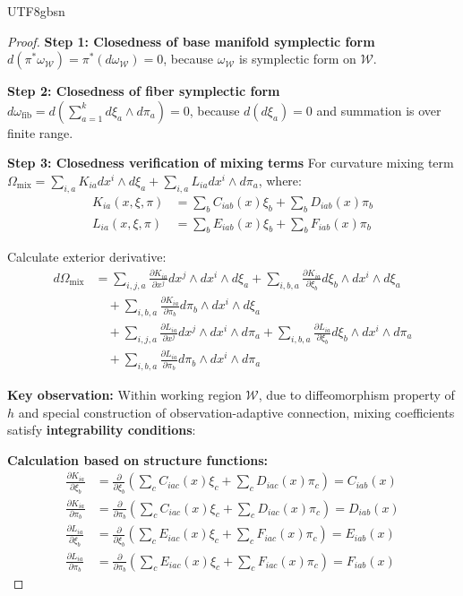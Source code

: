 \documentclass[a4paper,12pt]{extarticle}
\theoremstyle{definition}
\begin{document}
\begin{CJK}{UTF8}{gbsn}
\begin{proof}
\textbf{Step 1: Closedness of base manifold symplectic form}
$d(\pi^*\omega_{\mathcal{W}}) = \pi^*(d\omega_{\mathcal{W}}) = 0$, because $\omega_{\mathcal{W}}$ is symplectic form on $\mathcal{W}$.

\textbf{Step 2: Closedness of fiber symplectic form}
$d\omega_{\text{fib}} = d\left(\sum_{a=1}^k d\xi_a \wedge d\pi_a\right) = 0$, because $d(d\xi_a) = 0$ and summation is over finite range.

\textbf{Step 3: Closedness verification of mixing terms}
For curvature mixing term $\Omega_{\text{mix}} = \sum_{i,a} K_{ia} dx^i \wedge d\xi_a + \sum_{i,a} L_{ia} dx^i \wedge d\pi_a$, where:
\begin{align*}
K_{ia}(x,\xi,\pi) &= \sum_b C_{iab}(x)\xi_b + \sum_b D_{iab}(x)\pi_b\\
L_{ia}(x,\xi,\pi) &= \sum_b E_{iab}(x)\xi_b + \sum_b F_{iab}(x)\pi_b
\end{align*}

Calculate exterior derivative:
\begin{align*}
d\Omega_{\text{mix}} &= \sum_{i,j,a} \frac{\partial K_{ia}}{\partial x^j} dx^j \wedge dx^i \wedge d\xi_a + \sum_{i,b,a} \frac{\partial K_{ia}}{\partial \xi_b} d\xi_b \wedge dx^i \wedge d\xi_a\\
&\quad + \sum_{i,b,a} \frac{\partial K_{ia}}{\partial \pi_b} d\pi_b \wedge dx^i \wedge d\xi_a\\
&\quad + \sum_{i,j,a} \frac{\partial L_{ia}}{\partial x^j} dx^j \wedge dx^i \wedge d\pi_a + \sum_{i,b,a} \frac{\partial L_{ia}}{\partial \xi_b} d\xi_b \wedge dx^i \wedge d\pi_a\\
&\quad + \sum_{i,b,a} \frac{\partial L_{ia}}{\partial \pi_b} d\pi_b \wedge dx^i \wedge d\pi_a
\end{align*}

\textbf{Key observation:} Within working region $\mathcal{W}$, due to diffeomorphism property of $h$ and special construction of observation-adaptive connection, mixing coefficients satisfy \textbf{integrability conditions}:

\textbf{Calculation based on structure functions:}
\begin{align*}
\frac{\partial K_{ia}}{\partial \xi_b} &= \frac{\partial}{\partial \xi_b}\left(\sum_c C_{iac}(x)\xi_c + \sum_c D_{iac}(x)\pi_c\right) = C_{iab}(x)\\
\frac{\partial K_{ia}}{\partial \pi_b} &= \frac{\partial}{\partial \pi_b}\left(\sum_c C_{iac}(x)\xi_c + \sum_c D_{iac}(x)\pi_c\right) = D_{iab}(x)\\
\frac{\partial L_{ia}}{\partial \xi_b} &= \frac{\partial}{\partial \xi_b}\left(\sum_c E_{iac}(x)\xi_c + \sum_c F_{iac}(x)\pi_c\right) = E_{iab}(x)\\
\frac{\partial L_{ia}}{\partial \pi_b} &= \frac{\partial}{\partial \pi_b}\left(\sum_c E_{iac}(x)\xi_c + \sum_c F_{iac}(x)\pi_c\right) = F_{iab}(x)
\end{align*}


\end{proof}
\end{CJK}
\end{document}
